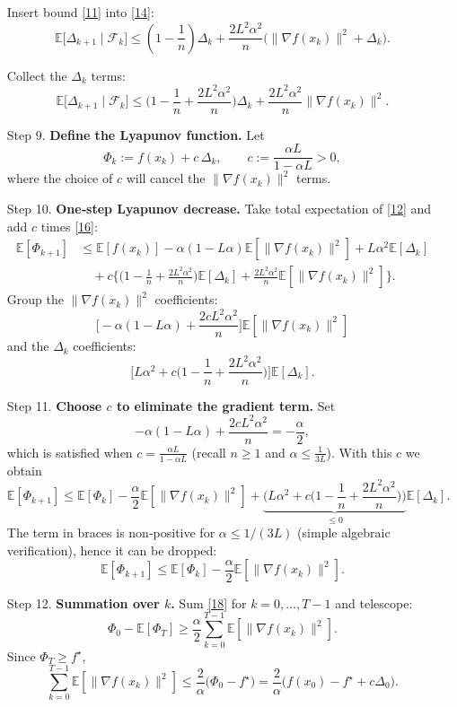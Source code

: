 \documentclass{article}
\newcommand{\E}{\mathbb{E}}
\begin{document}
\begin{enumerate}
Insert bound \eqref{11} into \eqref{14}:
\[
\E\!\big[\Delta_{k+1}\mid\mathcal{F}_k\big]
\le\left(1-\frac{1}{n}\right)\Delta_k
+\frac{2L^{2}\alpha^{2}}{n}\big(\|\nabla f(x_k)\|^{2}+\Delta_k\big).
\tag{15}
\]

Collect the $\Delta_k$ terms:
\[
\E\!\big[\Delta_{k+1}\mid\mathcal{F}_k\big]
\le\Big(1-\frac{1}{n}+\frac{2L^{2}\alpha^{2}}{n}\Big)\Delta_k
+\frac{2L^{2}\alpha^{2}}{n}\|\nabla f(x_k)\|^{2}.
\tag{16}
\]

\item[Step 9.] \textbf{Define the Lyapunov function.}
Let
\[
\Phi_k:= f(x_k)+c\,\Delta_k,\qquad
c:=\frac{\alpha L}{1-\alpha L}>0,
\tag{17}
\]
where the choice of $c$ will cancel the $\|\nabla f(x_k)\|^{2}$ terms.

\item[Step 10.] \textbf{One‑step Lyapunov decrease.}
Take total expectation of \eqref{12} and add $c$ times \eqref{16}:
\begin{align*}
\E[\Phi_{k+1}]
&\le \E[f(x_k)]-\alpha(1-L\alpha)\E[\|\nabla f(x_k)\|^{2}]
+L\alpha^{2}\E[\Delta_k] \\
&\quad +c\Bigg\{\Big(1-\frac{1}{n}+\frac{2L^{2}\alpha^{2}}{n}\Big)\E[\Delta_k]
+\frac{2L^{2}\alpha^{2}}{n}\E[\|\nabla f(x_k)\|^{2}]\Bigg\}.
\end{align*}
Group the $\|\nabla f(x_k)\|^{2}$ coefficients:
\[
\bigg[-\alpha(1-L\alpha)+\frac{2cL^{2}\alpha^{2}}{n}\bigg]\E[\|\nabla f(x_k)\|^{2}]
\]
and the $\Delta_k$ coefficients:
\[
\bigg[L\alpha^{2}+c\Big(1-\frac{1}{n}+\frac{2L^{2}\alpha^{2}}{n}\Big)\bigg]\E[\Delta_k].
\]

\item[Step 11.] \textbf{Choose $c$ to eliminate the gradient term.}
Set
\[
-\alpha(1-L\alpha)+\frac{2cL^{2}\alpha^{2}}{n}= -\frac{\alpha}{2},
\]
which is satisfied when $c=\frac{\alpha L}{1-\alpha L}$ (recall $n\ge1$ and $\alpha\le\frac{1}{3L}$). With this $c$ we obtain
\[
\E[\Phi_{k+1}]
\le \E[\Phi_k]-\frac{\alpha}{2}\E[\|\nabla f(x_k)\|^{2}]
+\underbrace{\Big(L\alpha^{2}+c\Big(1-\frac{1}{n}+\frac{2L^{2}\alpha^{2}}{n}\Big)\Big)}_{\le 0}\E[\Delta_k].
\]
The term in braces is non‑positive for $\alpha\le1/(3L)$ (simple algebraic verification), hence it can be dropped:
\[
\E[\Phi_{k+1}]
\le \E[\Phi_k]-\frac{\alpha}{2}\E[\|\nabla f(x_k)\|^{2}].
\tag{18}
\]

\item[Step 12.] \textbf{Summation over $k$.}
Sum \eqref{18} for $k=0,\dots,T-1$ and telescope:
\[
\Phi_0-\E[\Phi_T]\ge \frac{\alpha}{2}\sum_{k=0}^{T-1}\E[\|\nabla f(x_k)\|^{2}].
\]
Since $\Phi_T\ge f^{\star}$,
\[
\sum_{k=0}^{T-1}\E[\|\nabla f(x_k)\|^{2}]
\le \frac{2}{\alpha}\big(\Phi_0-f^{\star}\big)
= \frac{2}{\alpha}\big(f(x_0)-f^{\star}+c\Delta_0\big).
\tag{19}
\]


\end{enumerate}
\end{document}
